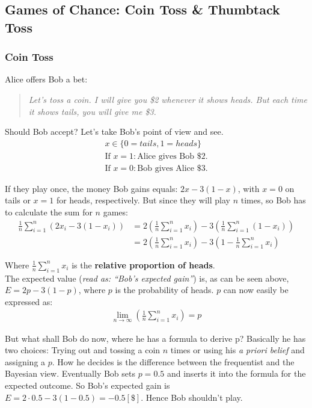 \subsection{Games of Chance: Coin Toss \& Thumbtack Toss}

\subsubsection*{Coin Toss}

Alice offers Bob a bet: 

\begin{quote}
\textit{Let's toss a coin. I will give you  \$2  whenever it shows heads. But each time it shows tails, you will give me \$3.}
\end{quote}
Should Bob accept? Let's take Bob's point of view and see.
\begin{align}
x \in \{0 = tails, 1 = heads\}\\
\mbox{If }x = 1: \mbox{Alice gives Bob \$2.}\\
\mbox{If }x = 0: \mbox{Bob gives Alice \$3.}
\end{align}

If they play once, the money Bob gains equals: $2x - 3 (1 - x)$, with $x = 0$ on tails or $x = 1$ for heads, respectively.
But since they will play $n$ times, so Bob has to calculate the sum for $n$ games:
\begin{align}
\frac{1}{n} \sum\limits_{i=1}^n \left(2x_i-3\left(1-x_i\right)\right) &= 2\left(\frac{1}{n}\sum\limits_{i=1}^n x_i\right)-3\left(\frac{1}{n}\sum\limits_{i=1}^n \left(1-x_i\right)\right)\\
&= 2\left(\frac{1}{n}\sum\limits_{i=1}^n x_i\right)-3\left(1-\frac{1}{n}\sum\limits_{i=1}^n x_i\right)
\end{align}

Where $\frac{1}{n}\sum\limits_{i=1}^n x_i$ is the \textbf{relative proportion of heads}.\\
The expected value (\textit{read as: ``Bob's expected gain''}) is, as can be seen above, $E = 2p - 3 (1 - p)$, where $p$ is the probability of heads.
$p$ can now easily be expressed as:
\begin{align}
\lim_{n\rightarrow\infty}\left(\frac{1}{n}\sum\limits_{i=1}^n x_i\right) = p
\end{align}

But what shall Bob do now, where he has a formula to derive p? Basically he has two choices: Trying out and tossing a coin $n$ times or using his \textit{a priori belief} and assigning a $p$.
How he decides is the difference between the frequentist and the Bayesian view. 
Eventually Bob sets $p = 0.5$ and inserts it into the formula for the expected outcome.
So Bob's expected gain is $E = 2 \cdot 0.5 - 3 (1 - 0.5) = -0.5 \! \left[ \$ \right] $. Hence Bob shouldn't play.

